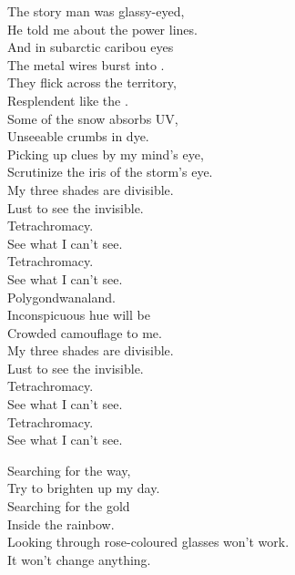 The story man was glassy-eyed, \\
He told me about the power lines. \\
And in subarctic caribou eyes \\
The metal wires burst into . \\

They flick across the territory, \\
Resplendent like the . \\
Some of the snow absorbs UV, \\
Unseeable crumbs in dye. \\

Picking up clues by my mind's eye, \\
Scrutinize the iris of the storm's eye. \\
My three shades are divisible. \\
Lust to see the invisible. \\

Tetrachromacy. \\
See what I can't see. \\
Tetrachromacy. \\
See what I can't see. \\

Polygondwanaland. \\

Inconspicuous hue will be \\
Crowded camouflage to me. \\
My three shades are divisible. \\
Lust to see the invisible. \\

Tetrachromacy. \\
See what I can't see. \\
Tetrachromacy. \\
See what I can't see. \\





Searching for the way, \\
Try to brighten up my day. \\
Searching for the gold \\
Inside the rainbow. \\
Looking through rose-coloured glasses won't work. \\
It won't change anything. \\

